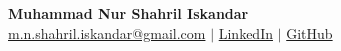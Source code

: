 \documentclass[../main.tex]{subfiles}
\begin{document}
\begin{center}
    \textbf{\fontsize{14}{14}\selectfont Muhammad Nur Shahril Iskandar} \\ \vspace{3pt}
    \small
    \faEnvelope \hspace{.5pt} \href{mailto:m.n.shahril.iskandar@gmail.com}{m.n.shahril.iskandar@gmail.com}
    $|$
    \faLinkedinSquare \hspace{.5pt} \href{https://www.linkedin.com/in/shahril-iskandar}{LinkedIn}
    $|$
    \faGithub \hspace{.5pt} \href{https://github.com/Shahril-Iskandar}{GitHub}
\end{center}
\end{document}
